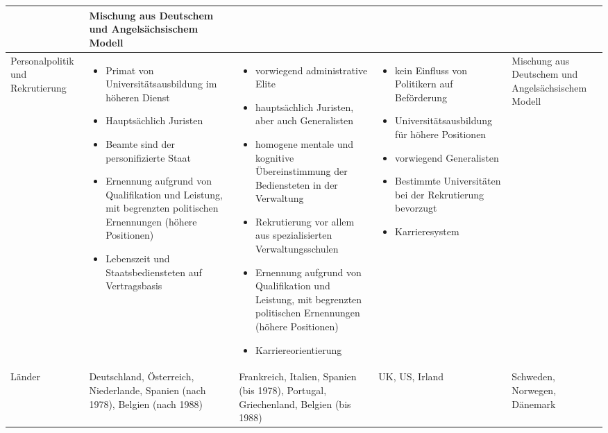 \begin{landscape}
\begin{scriptsize}
\begin{longtable}[H]{|L{4cm}|L{5cm}|L{5cm}|L{5cm}|L{4cm}|}
&	Mischung aus Deutschem und Angelsächsischem Modell\\\hline
Personalpolitik und Rekrutierung&
\begin{itemize}
\item Primat von Universitätsausbildung im höheren Dienst
\item Hauptsächlich Juristen
\item Beamte sind der personifizierte Staat
\item Ernennung aufgrund von Qualifikation und Leistung, mit begrenzten politischen Ernennungen (höhere Positionen)
\item Lebenszeit und Staatsbediensteten auf Vertragsbasis	
\end{itemize}&
 \vspace{-2mm}
\begin{itemize}
\item vorwiegend administrative Elite
\item hauptsächlich Juristen, aber auch Generalisten
\item homogene mentale und kognitive Übereinstimmung der Bediensteten in der Verwaltung                             \item Rekrutierung vor allem aus spezialisierten Verwaltungsschulen
\item Ernennung aufgrund von Qualifikation und Leistung, mit begrenzten politischen Ernennungen (höhere Positionen)
\item Karriereorientierung
 \vspace{-2mm}
\end{itemize}
&
\begin{itemize}
\item kein Einfluss von Politikern auf Beförderung
\item Universitätsausbildung für höhere Positionen
\item  vorwiegend Generalisten
\item Bestimmte Universitäten bei der Rekrutierung bevorzugt
\item Karrieresystem
\end{itemize}&	Mischung aus Deutschem und Angelsächsischem Modell\\\hline
Länder&	Deutschland, Österreich, Niederlande, Spanien (nach 1978), Belgien (nach 1988)&	Frankreich, Italien, Spanien (bis 1978), Portugal, Griechenland, Belgien (bis 1988) 	&UK, US, Irland&	Schweden, Norwegen, Dänemark\\\hline

\end{longtable}	
\end{scriptsize}
\end{landscape}	
